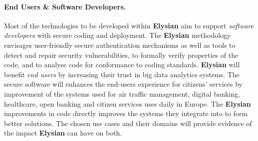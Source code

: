 \documentclass[a4paper,11pt]{article}
\newcommand{\project}[1]{\textbf{#1}\xspace}
\newcommand{\SECURITY}{\project{Elysian}}
\newcommand{\TheProject}{\SECURITY}
\begin{document}
\begin{mdframed}[backgroundcolor=blue!5]
\paragraph{End Users \& Software Developers.}
Most of the technologies to be developed within
\TheProject{}  aim to support \emph{software developers}
with secure coding and deployment. %
The \TheProject{} methodology envisages user-friendly secure authentication mechanisms as well as %
tools to detect and repair security vulnerabilities, to formally verify properties of the code, and to analyse code for conformance to coding standards. %
\TheProject{} will benefit \emph{end users} by increasing their trust in big data analytics systems.
The secure software will enhances the end-users experience for citizens' services by improvement of the systems used for air traffic management, digital banking, healthcare, open banking and citizen services uses daily in Europe. The \TheProject{} improvements in code directly improves the systems they integrate into to form better solutions.
The chosen use cases and their domains will provide evidence of the impact \TheProject{} can  have on both.
\end{mdframed}


\end{document}
